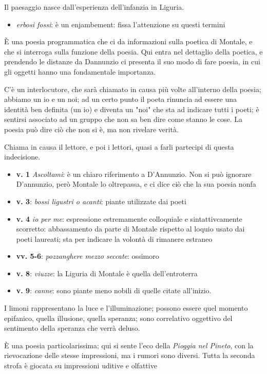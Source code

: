 \documentclass[a4paper, twoside, titlepage]{book}
\newcommand{\elenco}[1]{%
\begin{itemize}
#1
\end{itemize}}
\begin{document}
Il paesaggio nasce dall'esperienza dell'infanzia in Liguria.

\elenco{\item \textit{erbosi fossi}: è un enjambement: fissa l'attenzione su questi termini}

È una poesia programmatica che ci da informazioni sulla poetica di Montale, e che si interroga sulla funzione della poesia. Qui entra nel dettaglio della poetica, e prendendo le distanze da Dannunzio ci presenta il suo modo di fare poesia, in cui gli oggetti hanno una fondamentale importanza.

C'è un interlocutore, che sarà chiamato in causa più volte all'interno della poesia; abbiamo un io e un noi; ad un certo punto il poeta rinuncia ad essere una identità ben definita (un io) e diventa un "noi" che sta ad indicare tutti i poeti; è sentirsi associato ad un gruppo che non sa ben dire come stanno le cose.
La poesia può dire ciò che non si è, ma non rivelare verità.

Chiama in causa il lettore, e poi i lettori, quasi a farli partecipi di questa indecisione.

\elenco{\item \textbf{v. 1} \textit{Ascoltami}: è un chiaro riferimento a D'Annunzio. Non si può ignorare D'annunzio, però Montale lo oltrepassa, e ci dice ciò che la sua poesia nonfa\item \textbf{v. 3}: \textit{bossi ligustri o acanti}: piante utilizzate dai poeti\item \textbf{v. 4} \textit{io per me}: espressione estremamente colloquiale e sintattivcamente scorretto: abbassamento da parte di Montale rispetto al loquio usato dai poeti laureati; sta per indicare la volontà di rimanere estraneo\item \textbf{vv. 5-6}: \textit{pozzanghere mezzo seccate}: ossimoro\item \textbf{v. 8}: \textit{viuzze}: la Liguria di Montale è quella dell'entroterra\item \textbf{v. 9}: \textit{canne}: sono piante meno nobili di quelle citate all'inizio.}

I limoni rappresentano la luce e l'illuminazione; possono essere quel momento epifanico, quella illusione, quella speranza; sono correlativo oggettivo del sentimento della speranza che verrà deluso.

È una poesia particolarissima; qui si sente l'eco della \textit{Pioggia nel Pineto}, con la rievocazione delle stesse impressioni, ma i rumori sono diversi. Tutta la seconda strofa è giocata su impressioni uditive e olfattive
\end{document}
